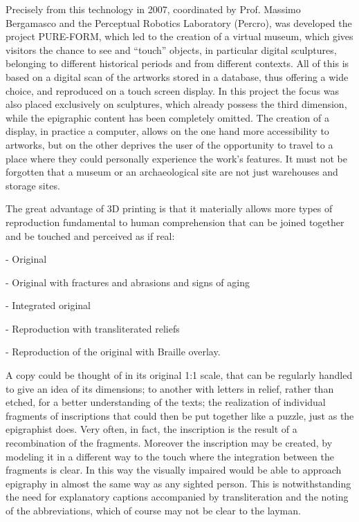 \documentclass[amsthm,ebook]{saparticle}
\begin{document}
Precisely from this technology in 2007, coordinated by Prof. Massimo Bergamasco and the Perceptual Robotics Laboratory
(Percro), was developed the project PURE-FORM, which led to the creation of a virtual museum, which gives visitors the
chance to see and “touch” objects, in particular digital sculptures, belonging to different historical periods and from
different contexts. All of this is based on a digital scan of the artworks stored in a database, thus offering a wide
choice, and reproduced on a touch screen display. In this project the focus was also placed exclusively on sculptures,
which already possess the third dimension, while the epigraphic content has been completely omitted. The creation of a
display, in practice a computer, allows on the one hand more accessibility to artworks, but on the other deprives the
user of the opportunity to travel to a place where they could personally experience the work’s features. It must not be
forgotten that a museum or an archaeological site are not just warehouses and storage sites.

The great advantage of 3D printing is that it materially allows more types of reproduction fundamental to human
comprehension that can be joined together and be touched and perceived as if real:

{}- Original

{}- Original with fractures and abrasions and signs of aging

{}- Integrated original

{}- Reproduction with transliterated reliefs

{}- Reproduction of the original with Braille overlay.

A copy could be thought of in its original 1:1 scale, that can be regularly handled to give an idea of its dimensions;
to another with letters in relief, rather than etched, for a better understanding of the texts; the realization of
individual fragments of inscriptions that could then be put together like a puzzle, just as the epigraphist does. Very
often, in fact, the inscription is the result of a recombination of the fragments. Moreover the inscription may be
created, by modeling it in a different way to the touch where the integration between the fragments is clear. In this
way the visually impaired would be able to approach epigraphy in almost the same way as any sighted person. This is
notwithstanding the need for explanatory captions accompanied by transliteration and the noting of the abbreviations,
which of course may not be clear to the layman.
\end{document}
